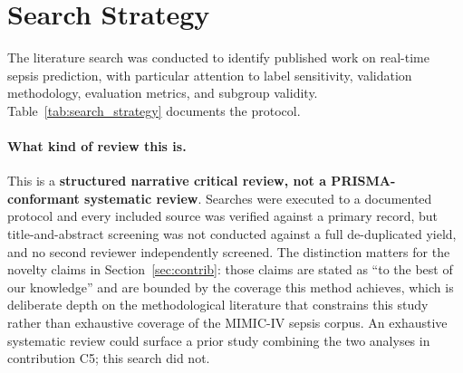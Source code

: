 \section{Search Strategy}
\label{sec:search_strategy}

The literature search was conducted to identify published work on real-time
sepsis prediction, with particular attention to label sensitivity, validation
methodology, evaluation metrics, and subgroup validity.
Table~\ref{tab:search_strategy} documents the protocol.

\paragraph{What kind of review this is.} This is a \textbf{structured narrative
critical review, not a PRISMA-conformant systematic review}. Searches were
executed to a documented protocol and every included source was verified
against a primary record, but title-and-abstract screening was not conducted
against a full de-duplicated yield, and no second reviewer independently
screened. The distinction matters for the novelty claims in
Section~\ref{sec:contrib}: those claims are stated as ``to the best of our
knowledge'' and are bounded by the coverage this method achieves, which is
deliberate depth on the methodological literature that constrains this study
rather than exhaustive coverage of the MIMIC-IV sepsis corpus. An exhaustive
systematic review could surface a prior study combining the two analyses in
contribution C5; this search did not.

